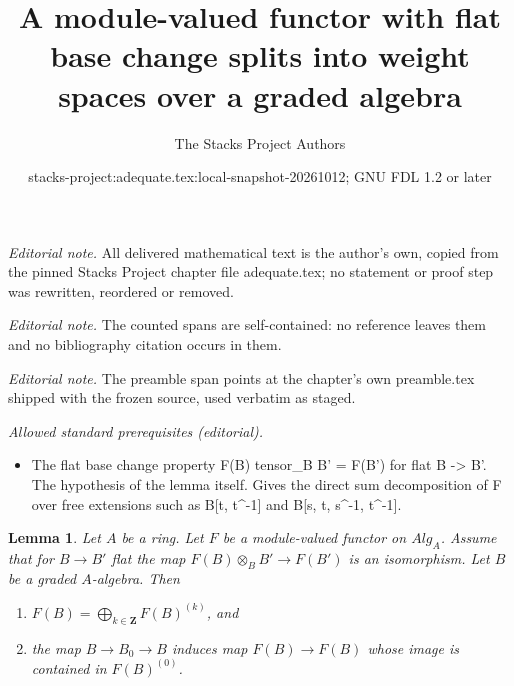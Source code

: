 \documentclass{stacks-project}
\title{A module-valued functor with flat base change splits into weight spaces over a graded algebra}
\author{The Stacks Project Authors}
\date{stacks-project:adequate.tex:local-snapshot-20261012; GNU FDL 1.2 or later}
\theoremstyle{plain}
\newtheorem{lemma}[subsection]{Lemma}
\theoremstyle{definition}
\theoremstyle{remark}
\numberwithin{equation}{subsection}
\begin{document}
\maketitle
\noindent\textit{Editorial note.} All delivered mathematical text is the author's own, copied from the pinned Stacks Project chapter file adequate.tex; no statement or proof step was rewritten, reordered or removed.\par\medskip
\noindent\textit{Editorial note.} The counted spans are self-contained: no reference leaves them and no bibliography citation occurs in them.\par\medskip
\noindent\textit{Editorial note.} The preamble span points at the chapter's own preamble.tex shipped with the frozen source, used verbatim as staged.\par\medskip
\noindent\textit{Allowed standard prerequisites (editorial).}\begin{itemize}
\item The flat base change property F(B) tensor\_B B' = F(B') for flat B -> B'. The hypothesis of the lemma itself. Gives the direct sum decomposition of F over free extensions such as B[t, t\textasciicircum{}-1] and B[s, t, s\textasciicircum{}-1, t\textasciicircum{}-1].
\end{itemize}\medskip
\begin{lemma}
\label{lemma-flat-functor-split}
Let $A$ be a ring.
Let $F$ be a module-valued functor on $\textit{Alg}_A$.
Assume that for $B \to B'$ flat the map
$F(B) \otimes_B B' \to F(B')$ is an isomorphism.
Let $B$ be a graded $A$-algebra. Then
\begin{enumerate}
\item $F(B) = \bigoplus_{k \in \mathbf{Z}} F(B)^{(k)}$, and
\item the map $B \to B_0 \to B$ induces map $F(B) \to F(B)$
whose image is contained in $F(B)^{(0)}$.
\end{enumerate}
\end{lemma}
\end{document}

